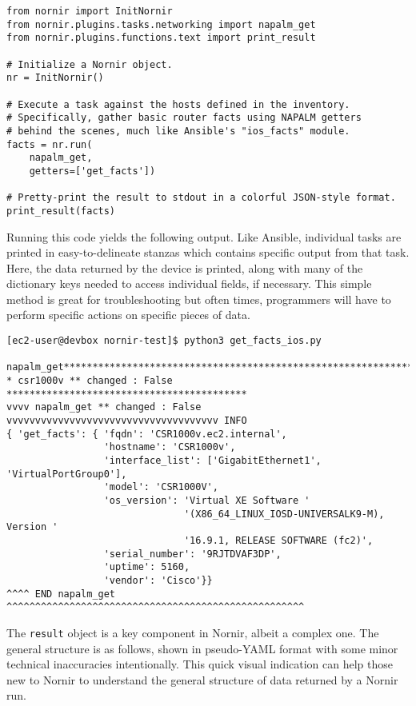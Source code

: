 \begin{verbatim}
from nornir import InitNornir
from nornir.plugins.tasks.networking import napalm_get
from nornir.plugins.functions.text import print_result

# Initialize a Nornir object.
nr = InitNornir()

# Execute a task against the hosts defined in the inventory.
# Specifically, gather basic router facts using NAPALM getters
# behind the scenes, much like Ansible's "ios_facts" module.
facts = nr.run(
    napalm_get,
    getters=['get_facts'])

# Pretty-print the result to stdout in a colorful JSON-style format.
print_result(facts)
\end{verbatim}

Running this code yields the following output. Like Ansible, individual tasks
are printed in easy-to-delineate stanzas which contains specific output from
that task. Here, the data returned by the device is printed, along with many
of the dictionary keys needed to access individual fields, if necessary. This
simple method is great for troubleshooting but often times, programmers will
have to perform specific actions on specific pieces of data.

\begin{verbatim}
[ec2-user@devbox nornir-test]$ python3 get_facts_ios.py 

napalm_get**************************************************************
* csr1000v ** changed : False ******************************************
vvvv napalm_get ** changed : False vvvvvvvvvvvvvvvvvvvvvvvvvvvvvvvvvvvvv INFO
{ 'get_facts': { 'fqdn': 'CSR1000v.ec2.internal',
                 'hostname': 'CSR1000v',
                 'interface_list': ['GigabitEthernet1', 'VirtualPortGroup0'],
                 'model': 'CSR1000V',
                 'os_version': 'Virtual XE Software '
                               '(X86_64_LINUX_IOSD-UNIVERSALK9-M), Version '
                               '16.9.1, RELEASE SOFTWARE (fc2)',
                 'serial_number': '9RJTDVAF3DP',
                 'uptime': 5160,
                 'vendor': 'Cisco'}}
^^^^ END napalm_get ^^^^^^^^^^^^^^^^^^^^^^^^^^^^^^^^^^^^^^^^^^^^^^^^^^^^
\end{verbatim}

The \verb|result| object is a key component in Nornir, albeit a complex one.
The general structure is as follows, shown in pseudo-YAML format with some
minor technical inaccuracies intentionally. This quick visual indication can
help those new to Nornir to understand the general structure of data returned
by a Nornir run.

